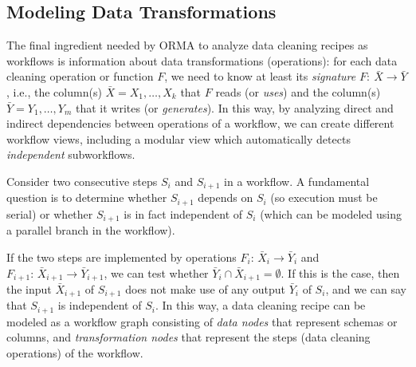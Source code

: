 \documentclass[conference]{ijdc-v14}
\newcommand{\orma}{\textsf{ORMA}\xspace}  %
\begin{document}
\subsection{Modeling Data Transformations}


The final ingredient needed by \orma to analyze data cleaning recipes as workflows is information
about {data transformations} (operations): for each data cleaning operation or function $F$, we need
to know at least its \emph{signature} $F{:}~ \bar X \to \bar Y$, i.e., the column(s)
$\bar X = X_1,\dots,X_k$ that $F$ reads (or \emph{uses}) and the column(s) $\bar Y = Y_1,\dots, Y_m$
that it writes (or \emph{generates}). In this way, by analyzing direct and indirect dependencies
between operations of a workflow, we can create different workflow views, including a modular view
which automatically detects \emph{independent} subworkflows.

Consider two consecutive steps $S_i$ and $S_{i+1}$ in a workflow. A fundamental question is to
determine whether $S_{i+1}$ depends on $S_i$ (so execution must be serial) or whether $S_{i+1}$ is
in fact {independent} of $S_i$ (which can be modeled using a  parallel branch in the workflow).

If the two steps are implemented by  operations $F_i{:}\,\bar X_i \to \bar Y_i$ and
$F_{i+1}{:}\,\bar X_{i+1} \to \bar Y_{i+1}$, we can test whether
$\bar Y_i \cap \bar X_{i+1} = \emptyset$. If this is the case, then the input $\bar X_{i+1}$ of
$S_{i+1}$ does not make use of any output $\bar Y_i$ of $S_i$, and we can say that $S_{i+1}$ is
{independent} of $S_i$.  In this way, a data cleaning recipe can be modeled as a workflow graph
consisting of \emph{data nodes} that represent schemas or columns, and \emph{transformation nodes}
that represent the steps (data cleaning operations) of the workflow. 
\end{document}
